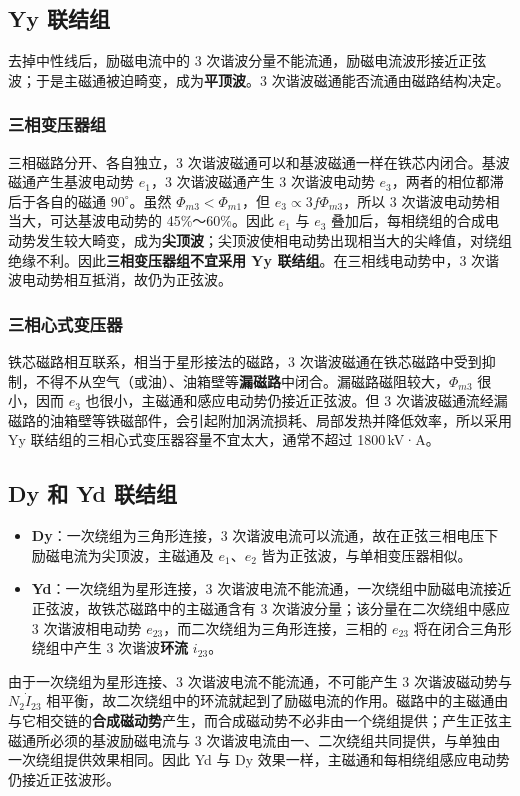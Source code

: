 \subsection{Yy 联结组}
去掉中性线后，励磁电流中的 3 次谐波分量不能流通，励磁电流波形接近正弦波；于是主磁通被迫畸变，成为\textbf{平顶波}。3 次谐波磁通能否流通由磁路结构决定。

\subsubsection{三相变压器组}
三相磁路分开、各自独立，3 次谐波磁通可以和基波磁通一样在铁芯内闭合。基波磁通产生基波电动势 $e_1$，3 次谐波磁通产生 3 次谐波电动势 $e_3$，两者的相位都滞后于各自的磁通 $90^\circ$。虽然 $\Phi_{m3}<\Phi_{m1}$，但 $e_3\propto3f\Phi_{m3}$，所以 3 次谐波电动势相当大，可达基波电动势的 45\%～60\%。因此 $e_1$ 与 $e_3$ 叠加后，每相绕组的合成电动势发生较大畸变，成为\textbf{尖顶波}；尖顶波使相电动势出现相当大的尖峰值，对绕组绝缘不利。因此\textbf{三相变压器组不宜采用 Yy 联结组}。在三相线电动势中，3 次谐波电动势相互抵消，故仍为正弦波。

\subsubsection{三相心式变压器}
铁芯磁路相互联系，相当于星形接法的磁路，3 次谐波磁通在铁芯磁路中受到抑制，不得不从空气（或油）、油箱壁等\textbf{漏磁路}中闭合。漏磁路磁阻较大，$\Phi_{m3}$ 很小，因而 $e_3$ 也很小，主磁通和感应电动势仍接近正弦波。但 3 次谐波磁通流经漏磁路的油箱壁等铁磁部件，会引起附加涡流损耗、局部发热并降低效率，所以采用 Yy 联结组的三相心式变压器容量不宜太大，通常不超过 1800\,kV·A。

\subsection{Dy 和 Yd 联结组}
\begin{itemize}
  \item \textbf{Dy}：一次绕组为三角形连接，3 次谐波电流可以流通，故在正弦三相电压下励磁电流为尖顶波，主磁通及 $e_1$、$e_2$ 皆为正弦波，与单相变压器相似。
  \item \textbf{Yd}：一次绕组为星形连接，3 次谐波电流不能流通，一次绕组中励磁电流接近正弦波，故铁芯磁路中的主磁通含有 3 次谐波分量；该分量在二次绕组中感应 3 次谐波相电动势 $e_{23}$，而二次绕组为三角形连接，三相的 $e_{23}$ 将在闭合三角形绕组中产生 3 次谐波\textbf{环流} $i_{23}$。
\end{itemize}
由于一次绕组为星形连接、3 次谐波电流不能流通，不可能产生 3 次谐波磁动势与 $N_2\dot I_{23}$ 相平衡，故二次绕组中的环流就起到了励磁电流的作用。磁路中的主磁通由与它相交链的\textbf{合成磁动势}产生，而合成磁动势不必非由一个绕组提供；产生正弦主磁通所必须的基波励磁电流与 3 次谐波电流由一、二次绕组共同提供，与单独由一次绕组提供效果相同。因此 Yd 与 Dy 效果一样，主磁通和每相绕组感应电动势仍接近正弦波形。


